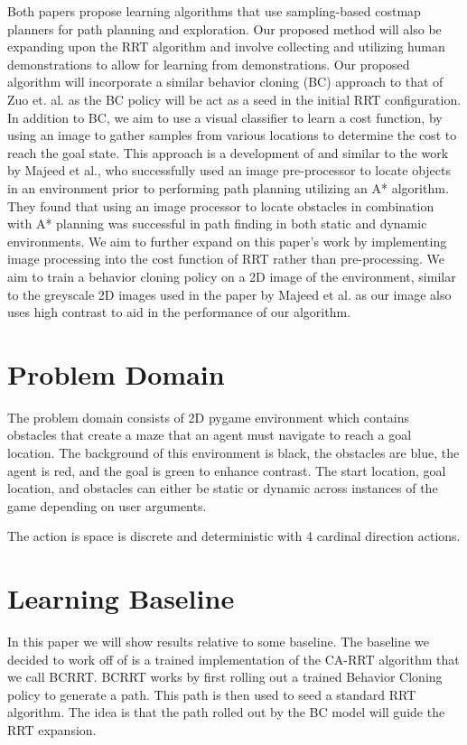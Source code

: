 \documentclass{article}
\begin{document}
Both papers propose learning algorithms that use sampling-based costmap planners for path planning and exploration. Our proposed method will also be expanding upon the RRT algorithm and involve collecting and utilizing human demonstrations to allow for learning from demonstrations. Our proposed algorithm will incorporate a similar behavior cloning (BC) approach to that of Zuo et. al. \cite{Zuo} as the BC policy will be act as a seed in the initial RRT configuration. In addition to BC, we aim to use a visual classifier to learn a cost function, by using an image to gather samples from various locations to determine the cost to reach the goal state. This approach is a development of and similar to the work by Majeed et al., who successfully used an image pre-processor to locate objects in an environment prior to performing path planning utilizing an A* algorithm. \cite{Majeed} They found that using an image processor to locate obstacles in combination with A* planning was successful in path finding in both static and dynamic environments. \cite{Majeed} We aim to further expand on this paper's work by implementing image processing into the cost function of RRT rather than pre-processing. We aim to train a behavior cloning policy on a 2D image of the environment, similar to the greyscale 2D images used in the paper by Majeed et al. as our image also uses high contrast to aid in the performance of our algorithm. 


\section{Problem Domain}

The problem domain consists of 2D pygame environment which contains obstacles that create a maze that an agent must navigate to reach a goal location. 
The background of this environment is black, the obstacles are blue, the agent is red, and the goal is green to enhance contrast. The start location, goal location, and obstacles can either be static or dynamic across instances of the game depending on user arguments.

The action is space is discrete and deterministic with 4 cardinal direction actions. 

\section{Learning Baseline}

In this paper we will show results relative to some baseline. The baseline we decided to work off of is a trained implementation of the CA-RRT algorithm \cite{Zuo} that we call BCRRT. 
BCRRT works by first rolling out a trained Behavior Cloning policy to generate a path. 
This path is then used to seed a standard RRT algorithm. The idea is that the path rolled out by the BC model will guide the RRT expansion. 
\end{document}
